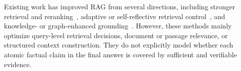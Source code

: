 
Existing work has improved RAG from several directions, including stronger retrieval and reranking~\cite{karpukhin2020dense,izacard2021leveraging}, adaptive or self-reflective retrieval control~\cite{asai2024self,jeong2024adaptive,yan2024corrective}, and knowledge- or graph-enhanced grounding~\cite{edge2024local}. 
However, these methods mainly optimize query-level retrieval decisions, document or passage relevance, or structured context construction. They do not explicitly model whether each atomic factual claim in the final answer is covered by sufficient and verifiable evidence.

